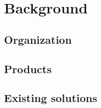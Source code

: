 \section{Background}
\label{sec:Background}

\subsection{Organization}
\label{subsec:Organization}

\subsection{Products}
\label{subsec:Products}

\subsection{Existing solutions}
\label{subsec:API}
